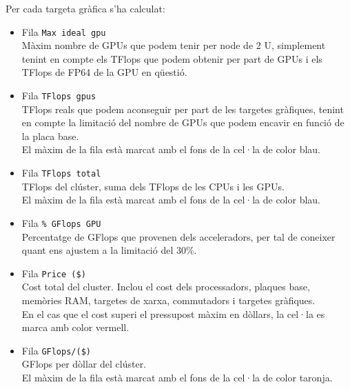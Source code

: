 Per cada targeta gràfica s'ha calculat:
\begin{itemize}
    \item Fila \texttt{Max ideal gpu}\\
        Màxim nombre de GPUs que podem tenir per node de 2 U, simplement tenint en compte els TFlops que podem obtenir per part de GPUs i els TFlops de FP64 de la GPU en qüestió.

    \item Fila \texttt{TFlops gpus}\\
        TFlops reals que podem aconseguir per part de les targetes gràfiques, tenint en compte la limitació del nombre de GPUs que podem encavir en funció de la placa base.\\
        El màxim de la fila està marcat amb el fons de la cel·la de color blau.
        
    \item Fila \texttt{TFlops total}\\
        TFlops del clúster, suma dels TFlops de les CPUs i les GPUs. \\
        El màxim de la fila està marcat amb el fons de la cel·la de color blau.

    \item Fila \texttt{\% GFlops GPU}\\
        Percentatge de GFlops que provenen dels acceleradors, per tal de coneixer quant ens ajustem a la limitació del 30\%.

    \item Fila \texttt{Price (\$)}\\
        Cost total del cluster. Inclou el cost dels processadors, plaques base, memòries RAM, targetes de xarxa, commutadors i targetes gràfiques. \\
        En el cas que el cost superi el pressupost màxim en dòllars, la cel·la es marca amb color vermell.

    \item Fila \texttt{GFlops/(\$)}\\
        GFlops per dòllar del clúster.\\
        El màxim de la fila està marcat amb el fons de la cel·la de color taronja.
\end{itemize}
